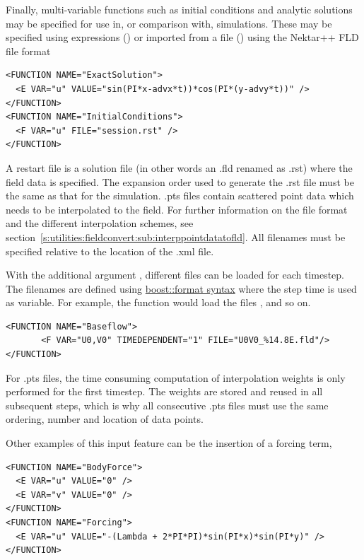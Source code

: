 Finally, multi-variable functions such as initial conditions and analytic
solutions may be specified for use in, or comparison with, simulations. These
may be specified using expressions () or imported from a file
() using the Nektar++ FLD file format

\begin{lstlisting}[style=XMLStyle]
<FUNCTION NAME="ExactSolution">
  <E VAR="u" VALUE="sin(PI*x-advx*t))*cos(PI*(y-advy*t))" />
</FUNCTION>
<FUNCTION NAME="InitialConditions">
  <F VAR="u" FILE="session.rst" />
</FUNCTION>
\end{lstlisting}

A restart file is a solution file (in other words an .fld renamed as .rst) where
the field data is specified. The expansion order used to generate the .rst file
must be the same as that for the simulation.
.pts files contain scattered point data which needs to be interpolated to the field.
For further information on the file format and the different interpolation schemes, see
section~\ref{s:utilities:fieldconvert:sub:interppointdatatofld}.
All filenames must be specified relative to the location of the .xml file.

With the additional argument , different files can be
loaded for each timestep. The filenames are defined using
\href{http://www.boost.org/doc/libs/1_56_0/libs/format/doc/format.html#syntax}{boost::format syntax}
where the step time is used as variable. For example, the function
 would load the files ,
 and so on.

\begin{lstlisting}[style=XMLStyle]
<FUNCTION NAME="Baseflow">
       <F VAR="U0,V0" TIMEDEPENDENT="1" FILE="U0V0_%14.8E.fld"/>
</FUNCTION>
\end{lstlisting}

For .pts files, the time consuming computation of interpolation weights is only
performed for the first timestep. The weights are stored and reused in all subsequent steps, 
which is why all consecutive .pts files must use the same ordering, number and location of
data points.

Other examples of this input feature can be the insertion of a forcing term,

\begin{lstlisting}[style=XMLStyle]
<FUNCTION NAME="BodyForce">
  <E VAR="u" VALUE="0" />
  <E VAR="v" VALUE="0" />
</FUNCTION>
<FUNCTION NAME="Forcing">
  <E VAR="u" VALUE="-(Lambda + 2*PI*PI)*sin(PI*x)*sin(PI*y)" />
</FUNCTION>
\end{lstlisting}

